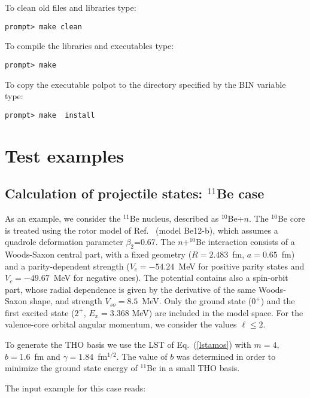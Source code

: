 \documentclass[preprint,12pt]{elsarticle}
\begin{document}
To clean old files and libraries type:

\begin{verbatim}prompt> make clean \end{verbatim} 

To compile the libraries and executables type:

\begin{verbatim}prompt> make  \end{verbatim}

To copy the executable polpot to the directory specified by the BIN variable
type:

 \begin{verbatim}prompt> make  install \end{verbatim}


\section{Test examples}
\subsection{Calculation of projectile states: $^{11}$Be case}
As an example, we consider the $^{11}$Be nucleus, described as  $^{10}$Be+$n$. The $^{10}$Be core 
is treated using the rotor model of Ref.~\cite{Nun96} (model Be12-b), which assumes a quadrole deformation 
parameter $\beta_2$=0.67. The $n$+$^{10}$Be interaction consists of a
Woods-Saxon central part, with a fixed geometry ($R=2.483$~fm,
$a=0.65$~fm) and a  parity-dependent strength ($V_{c}=-54.24$~MeV for positive parity states and $V_{c}=-49.67$~MeV for negative ones). The potential contains
also a spin-orbit part, whose radial dependence is given by the
derivative of the same Woods-Saxon shape, and strength
$V_{so}=8.5$~MeV. Only the ground state ($0^+$) and the first excited
state  ($2^{+}$, $E_x= 3.368$ MeV) are included in the model
space. For the valence-core orbital angular momentum, we consider
the values $\ell \leq 2$.  

To generate  the THO basis we use the LST of Eq.~(\ref{lstamos}) with
$m=4$, $b=1.6$~fm and $\gamma=1.84$~fm$^{1/2}$. The value of  
$b$ was determined in order to minimize the ground state energy of
$^{11}$Be in a small THO basis.

The input example for this case reads:
\end{document}
